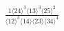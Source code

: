 \documentclass[varwidth, border=5pt]{standalone}
\begin{document}
\begin{my}
$\begin{gathered}
\scriptscriptstyle\frac{1⟨24⟩^3⟨13⟩^3⟨25⟩^2}{⟨12⟩^3⟨14⟩⟨23⟩⟨34⟩^4}
\end{gathered}$
\end{my}
\end{document}
